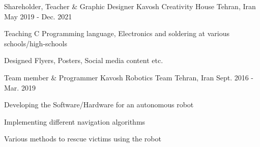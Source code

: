\begin{cventries}

\cventry
{Shareholder, Teacher \& Graphic Designer} %
{Kavosh Creativity House} %
{Tehran, Iran} %
{May 2019 - Dec. 2021} %
{ %
\begin{cvitems}
\item {\vspace{-4.0mm}\fontsize{10}{11}\selectfont Teaching C Programming language, Electronics and soldering at various schools/high-schools}
\item {\fontsize{10}{11}\selectfont Designed Flyers, Posters, Social media content etc.}
\end{cvitems} 
}


\cventry
{Team member \& Programmer} %
{Kavosh Robotics Team} %
{Tehran, Iran} %
{Sept. 2016 - Mar. 2019} %
{ %
\begin{cvitems}
\item {\vspace{-4.0mm}\fontsize{10}{11}\selectfont Developing the Software/Hardware for an autonomous robot}
\item {\fontsize{10}{11}\selectfont Implementing different navigation algorithms}
\item {\fontsize{10}{11}\selectfont Various methods to rescue victims using the robot}
\end{cvitems}
}


\end{cventries}
